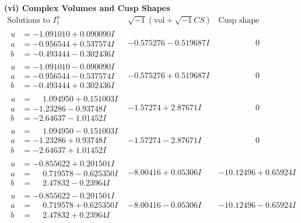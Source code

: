 \documentclass[1p]{elsarticle_modified}
\theoremstyle{definition}
\newcommand{\I}{\sqrt{-1}}
\begin{document}
\newpage\flushleft \textbf{(vi) Complex Volumes and Cusp Shapes}
$$\begin{array}{c|c|c}  
\text{Solutions to }I^u_{1}& \I (\text{vol} + \sqrt{-1}CS) & \text{Cusp shape}\\
 \hline 
\begin{aligned}
u &= -1.091010 + 0.090090 I \\
a &= -0.956544 + 0.537574 I \\
b &= -0.493444 - 0.302436 I\end{aligned}
 & -0.575276 - 0.519687 I & \phantom{-0.000000 } 0 \\ \hline\begin{aligned}
u &= -1.091010 - 0.090090 I \\
a &= -0.956544 - 0.537574 I \\
b &= -0.493444 + 0.302436 I\end{aligned}
 & -0.575276 + 0.519687 I & \phantom{-0.000000 } 0 \\ \hline\begin{aligned}
u &= \phantom{-}1.094950 + 0.151003 I \\
a &= -1.23286 - 0.93748 I \\
b &= -2.64637 - 1.01452 I\end{aligned}
 & -1.57274 + 2.87671 I & \phantom{-0.000000 } 0 \\ \hline\begin{aligned}
u &= \phantom{-}1.094950 - 0.151003 I \\
a &= -1.23286 + 0.93748 I \\
b &= -2.64637 + 1.01452 I\end{aligned}
 & -1.57274 - 2.87671 I & \phantom{-0.000000 } 0 \\ \hline\begin{aligned}
u &= -0.855622 + 0.201501 I \\
a &= \phantom{-}0.719578 - 0.625350 I \\
b &= \phantom{-}2.47832 - 0.23964 I\end{aligned}
 & -8.00416 + 0.05306 I & -10.12496 + 0.65924 I \\ \hline\begin{aligned}
u &= -0.855622 - 0.201501 I \\
a &= \phantom{-}0.719578 + 0.625350 I \\
b &= \phantom{-}2.47832 + 0.23964 I\end{aligned}
 & -8.00416 - 0.05306 I & -10.12496 - 0.65924 I \\ \hline\begin{aligned}

\end{aligned}
\end{array}$$
\end{document}
